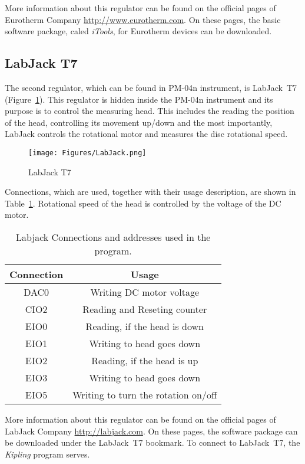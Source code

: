 \documentclass[a4paper,11pt,oneside]{report}
\theoremstyle{named}
\begin{document}
More information about this regulator can be found on the official pages of
Eurotherm Company \url{http://www.eurotherm.com}. On these pages, the basic
software package, caled \textit{iTools}, for Eurotherm devices can be
downloaded. 

\subsection{LabJack T7}
\label{sec:LabJack}

The second regulator, which can be found in PM-04n instrument, is LabJack~T7
(Figure~\ref{fig:LabJackT7}). This regulator is hidden inside the PM-04n
instrument and its purpose is to control the measuring head. This includes the
reading the position of the head, controlling its movement up/down and the most
importantly, LabJack controls the rotational motor and measures the disc
rotational speed. 

\begin{figure}[t]
  \centering
  \texttt{[image: Figures/LabJack.png]}
  \caption{LabJack T7}
  \label{fig:LabJackT7}
\end{figure}

Connections, which are used, together with their usage description, are shown in
Table~\ref{tab:LabJackConnection}. Rotational speed of the head is controlled by
the voltage of the DC motor.

\begin{table}
  \centering
  \begin{tabular}{c|c}
    \hline
    Connection  & Usage  \\
    \hline
    DAC0      & Writing DC motor voltage \\
    CIO2      & Reading and Reseting counter \\
    EIO0      & Reading, if the head is down \\
    EIO1      & Writing to head goes down \\
    EIO2      & Reading, if the head is up \\
    EIO3      & Writing to head goes down \\
    EIO5      & Writing to turn the rotation on/off \\
    \hline
  \end{tabular}
  \caption{Labjack Connections and addresses used in the program.}
  \label{tab:LabJackConnection}
\end{table}

More information about this regulator can be found on the official pages of
LabJack Company \url{http://labjack.com}. On these pages, the software
package can be downloaded under the LabJack~T7 bookmark. To connect to LabJack~T7, the
\textit{Kipling} program serves. 
\end{document}
